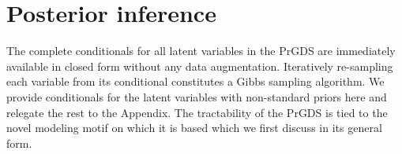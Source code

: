 \documentclass{article}
\begin{document}














\section{Posterior inference}
\label{sec:mcmc}
The complete conditionals for all latent variables in the PrGDS are immediately available in closed form without any data augmentation. Iteratively re-sampling each variable from its conditional constitutes a Gibbs sampling algorithm. We provide conditionals for the latent variables with non-standard priors here and relegate the rest to the Appendix. The tractability of the PrGDS is tied to the novel modeling motif on which it is based which we first discuss in its general form.~
\end{document}
